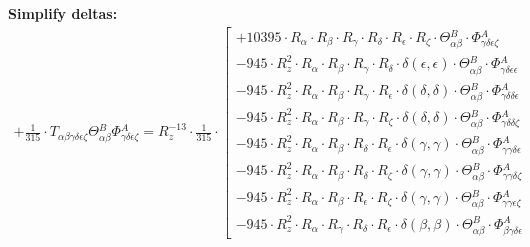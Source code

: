 \documentclass{article}
\begin{document}
\textbf{Simplify deltas:}
\begin{subequations}\begin{gather}
+ \frac{1}{315} \cdot T_{\alpha{}\beta{}\gamma{}\delta{}\epsilon{}\zeta{}} \Theta{}^{B}_{\alpha{}\beta{}} \Phi{}^{A}_{\gamma{}\delta{}\epsilon{}\zeta{}} = R_{z}^{-13} \cdot \frac{1}{315} \cdot  \left[ \begin{array}{c} 
 		+ 10395 \cdot R_{\alpha{}} \cdot R_{\beta{}} \cdot R_{\gamma{}} \cdot R_{\delta{}} \cdot R_{\epsilon{}} \cdot R_{\zeta{}} \cdot \Theta{}^{B}_{\alpha{}\beta{}} \cdot \Phi{}^{A}_{\gamma{}\delta{}\epsilon{}\zeta{}} 
 \\[0.2em] 		 - 945 \cdot R_{z}^{2} \cdot R_{\alpha{}} \cdot R_{\beta{}} \cdot R_{\gamma{}} \cdot R_{\delta{}} \cdot \delta{}\left(\epsilon{}, \epsilon{}\right) \cdot \Theta{}^{B}_{\alpha{}\beta{}} \cdot \Phi{}^{A}_{\gamma{}\delta{}\epsilon{}\epsilon{}} 
 \\[0.2em] 		 - 945 \cdot R_{z}^{2} \cdot R_{\alpha{}} \cdot R_{\beta{}} \cdot R_{\gamma{}} \cdot R_{\epsilon{}} \cdot \delta{}\left(\delta{}, \delta{}\right) \cdot \Theta{}^{B}_{\alpha{}\beta{}} \cdot \Phi{}^{A}_{\gamma{}\delta{}\delta{}\epsilon{}} 
 \\[0.2em] 		 - 945 \cdot R_{z}^{2} \cdot R_{\alpha{}} \cdot R_{\beta{}} \cdot R_{\gamma{}} \cdot R_{\zeta{}} \cdot \delta{}\left(\delta{}, \delta{}\right) \cdot \Theta{}^{B}_{\alpha{}\beta{}} \cdot \Phi{}^{A}_{\gamma{}\delta{}\delta{}\zeta{}} 
 \\[0.2em] 		 - 945 \cdot R_{z}^{2} \cdot R_{\alpha{}} \cdot R_{\beta{}} \cdot R_{\delta{}} \cdot R_{\epsilon{}} \cdot \delta{}\left(\gamma{}, \gamma{}\right) \cdot \Theta{}^{B}_{\alpha{}\beta{}} \cdot \Phi{}^{A}_{\gamma{}\gamma{}\delta{}\epsilon{}} 
 \\[0.2em] 		 - 945 \cdot R_{z}^{2} \cdot R_{\alpha{}} \cdot R_{\beta{}} \cdot R_{\delta{}} \cdot R_{\zeta{}} \cdot \delta{}\left(\gamma{}, \gamma{}\right) \cdot \Theta{}^{B}_{\alpha{}\beta{}} \cdot \Phi{}^{A}_{\gamma{}\gamma{}\delta{}\zeta{}} 
 \\[0.2em] 		 - 945 \cdot R_{z}^{2} \cdot R_{\alpha{}} \cdot R_{\beta{}} \cdot R_{\epsilon{}} \cdot R_{\zeta{}} \cdot \delta{}\left(\gamma{}, \gamma{}\right) \cdot \Theta{}^{B}_{\alpha{}\beta{}} \cdot \Phi{}^{A}_{\gamma{}\gamma{}\epsilon{}\zeta{}} 
 \\[0.2em] 		 - 945 \cdot R_{z}^{2} \cdot R_{\alpha{}} \cdot R_{\gamma{}} \cdot R_{\delta{}} \cdot R_{\epsilon{}} \cdot \delta{}\left(\beta{}, \beta{}\right) \cdot \Theta{}^{B}_{\alpha{}\beta{}} \cdot \Phi{}^{A}_{\beta{}\gamma{}\delta{}\epsilon{}} 

\end{array}
\end{gather}
\end{subequations}
\end{document}
